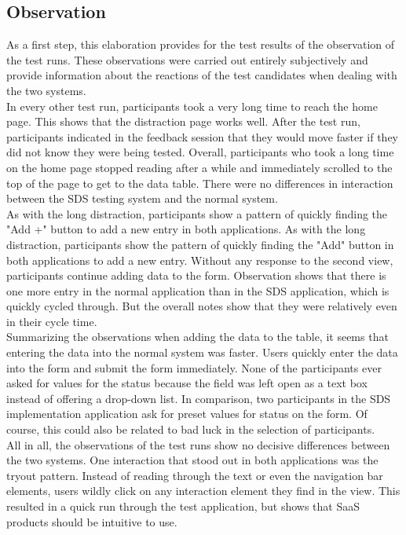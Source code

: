 \subsection{Observation}
As a first step, this elaboration provides for the test results of the observation of the test runs. These observations were carried out entirely subjectively and provide information about the reactions of the test candidates when dealing with the two systems. \\
In every other test run, participants took a very long time to reach the home page. This shows that the distraction page works well. After the test run, participants indicated in the feedback session that they would move faster if they did not know they were being tested. Overall, participants who took a long time on the home page stopped reading after a while and immediately scrolled to the top of the page to get to the data table. There were no differences in interaction between the SDS testing system and the normal system. \\
As with the long distraction, participants show a pattern of quickly finding the "Add +" button to add a new entry in both applications. As with the long distraction, participants show the pattern of quickly finding the "Add" button in both applications to add a new entry. Without any response to the second view, participants continue adding data to the form. Observation shows that there is one more entry in the normal application than in the \ac{SDS} application, which is quickly cycled through. But the overall notes show that they were relatively even in their cycle time. \\
Summarizing the observations when adding the data to the table, it seems that entering the data into the normal system was faster. Users quickly enter the data into the form and submit the form immediately. None of the participants ever asked for values for the status because the field was left open as a text box instead of offering a drop-down list. In comparison, two participants in the \ac{SDS} implementation application ask for preset values for status on the form. Of course, this could also be related to bad luck in the selection of participants. \\
All in all, the observations of the test runs show no decisive differences between the two systems. One interaction that stood out in both applications was the tryout pattern. Instead of reading through the text or even the navigation bar elements, users wildly click on any interaction element they find in the view. This resulted in a quick run through the test application, but shows that SaaS products should be intuitive to use.

